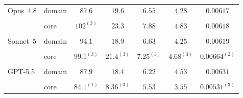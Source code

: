 \begin{table}[H]
\begin{tabular}{ll*{5}{c}}
Opus~4.8 & domain & \cellcolor{llpC}$87.6$ & \cellcolor{llpB}$19.6$ & \cellcolor{llpB}$6.55$ & \cellcolor{llpB}$4.28$ & \cellcolor{llpA}$0.00617$ \\
 &  & \cellcolor{llpC}{\scriptsize$[83.1,\,89.1]$} & \cellcolor{llpB}{\scriptsize$[17.7,\,21.5]$} & \cellcolor{llpB}{\scriptsize$[6.30,\,7.45]$} & \cellcolor{llpB}{\scriptsize$[4.16,\,5.30]$} & \cellcolor{llpA}{\scriptsize$[0.00613,\,0.00634]$} \\[2pt]
 & core & \cellcolor{llpB}$102^{(3)}$ & \cellcolor{llpB}$23.3$ & \cellcolor{llpB}$7.88$ & \cellcolor{llpA}$4.83$ & \cellcolor{llpA}$0.00618$ \\
 &  & \cellcolor{llpB}{\scriptsize$[96.4,\,122]$} & \cellcolor{llpB}{\scriptsize$[21.2,\,28.1]$} & \cellcolor{llpB}{\scriptsize$[7.34,\,10.0]$} & \cellcolor{llpA}{\scriptsize$[4.59,\,6.29]$} & \cellcolor{llpA}{\color{llpSpread}{\scriptsize$[0.00588,\,0.0178]$}} \\[2pt]
Sonnet~5 & domain & \cellcolor{llpC}$94.1$ & \cellcolor{llpC}$18.9$ & \cellcolor{llpB}$6.63$ & \cellcolor{llpB}$4.25$ & \cellcolor{llpA}$0.00619$ \\
 &  & \cellcolor{llpC}{\scriptsize$[88.3,\,126]$} & \cellcolor{llpC}{\scriptsize$[17.8,\,24.3]$} & \cellcolor{llpB}{\scriptsize$[6.22,\,7.52]$} & \cellcolor{llpB}{\scriptsize$[3.98,\,5.47]$} & \cellcolor{llpA}{\scriptsize$[0.00614,\,0.00659]$} \\[2pt]
 & core & \cellcolor{llpB}$99.1^{(3)}$ & \cellcolor{llpA}$21.4^{(3)}$ & \cellcolor{llpA}$7.25^{(3)}$ & \cellcolor{llpA}$4.68^{(3)}$ & \cellcolor{llpB}$0.00664^{(2)}$ \\
 &  & \cellcolor{llpB}{\scriptsize$[76.8,\,104]$} & \cellcolor{llpA}{\scriptsize$[19.1,\,21.8]$} & \cellcolor{llpA}{\scriptsize$[5.83,\,7.94]$} & \cellcolor{llpA}{\scriptsize$[4.01,\,4.96]$} & \cellcolor{llpB}{\scriptsize$[0.00572,\,0.00755]$} \\[2pt]
GPT-5.5 & domain & \cellcolor{llpC}$87.9$ & \cellcolor{llpC}$18.4$ & \cellcolor{llpC}$6.22$ & \cellcolor{llpA}$4.53$ & \cellcolor{llpA}$0.00631$ \\
 &  & \cellcolor{llpC}{\scriptsize$[85.4,\,88.7]$} & \cellcolor{llpC}{\scriptsize$[18.1,\,24.7]$} & \cellcolor{llpC}{\scriptsize$[5.94,\,6.93]$} & \cellcolor{llpA}{\scriptsize$[4.22,\,4.61]$} & \cellcolor{llpA}{\scriptsize$[0.00614,\,0.00663]$} \\[2pt]
 & core & \cellcolor{llpC}$84.1^{(1)}$ & \cellcolor{llpD}$8.36^{(3)}$ & \cellcolor{llpC}$5.53$ & \cellcolor{llpC}$3.55$ & \cellcolor{llpC}$0.00531^{(3)}$ \\

\end{tabular}
\end{table}
